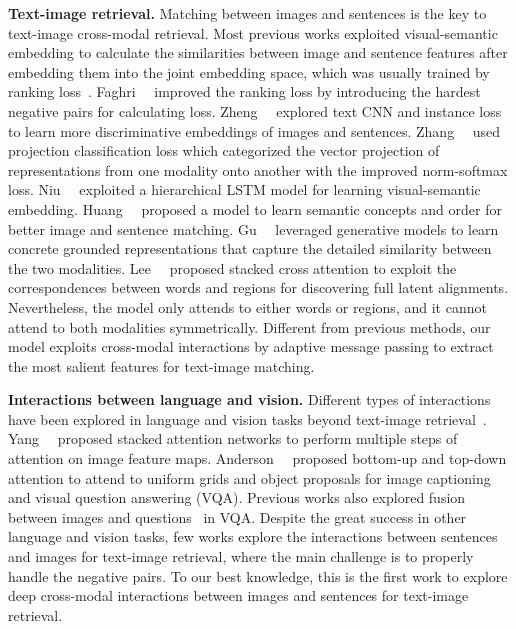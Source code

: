 \documentclass[10pt,twocolumn,letterpaper]{article}
\begin{document}
\noindent\textbf{Text-image retrieval.}
Matching between images and sentences is the key to text-image cross-modal retrieval. 
Most previous works exploited visual-semantic embedding to calculate the similarities between image and sentence features after embedding them into the joint embedding space, which was usually trained by ranking loss~\cite{kiros2014unifying,vendrov2015order,wang2016learning,klein2015associating,fang2015captions,eisenschtat2017linking,plummer2017conditional,karpathy2015deep}. 
Faghri~\etal~\cite{faghri2017vse++} improved the ranking loss by introducing the hardest negative pairs for calculating loss. 
Zheng~\etal~\cite{zheng2017dual} explored text CNN and instance loss to learn more discriminative embeddings of images and sentences. 
Zhang~\etal~\cite{ying2018CMPM} used projection classification loss which categorized the vector projection of representations from one modality onto another with the improved norm-softmax loss.
Niu~\etal~\cite{niu2017hierarchical} exploited a hierarchical LSTM model for learning visual-semantic embedding. 
Huang~\etal~\cite{huang2017learning} proposed a model to learn semantic concepts and order for better image and sentence matching. 
Gu~\etal~\cite{gu2018look} leveraged generative models to learn concrete grounded representations that capture the detailed similarity between the two modalities. 
Lee~\etal~\cite{lee2018stacked} proposed stacked cross attention to exploit the correspondences between words and regions for discovering full latent alignments. 
Nevertheless, the model only attends to either words or regions, and it cannot attend to both modalities symmetrically.
Different from previous methods, our model exploits cross-modal interactions by adaptive message passing to extract the most salient features for text-image matching.

\noindent\textbf{Interactions between language and vision.}
Different types of interactions have been explored in language and vision tasks beyond text-image retrieval~\cite{yu2017multi,chen2017sca,lu2017knowing,zhu2017structured,kim2018bilinear,xu2016ask,lu2016hierarchical,liu2018show,liu2019improving}. 
Yang~\etal~\cite{yang2016stacked} proposed stacked attention networks to perform multiple steps of attention on image feature maps. 
Anderson~\etal~\cite{anderson2017bottom} proposed bottom-up and top-down attention to attend to uniform grids and object proposals for image captioning and visual question answering (VQA). 
Previous works also explored fusion between images and questions~\cite{fukui2016multimodal,gao2016compact,kim2016hadamard,yu2017multi,nguyen2018improved} in VQA. 
Despite the great success in other language and vision tasks, few works explore the interactions between sentences and images for text-image retrieval, where the main challenge is to properly handle the negative pairs.
To our best knowledge, this is the first work to explore deep cross-modal interactions between images and sentences for text-image retrieval.
\end{document}
